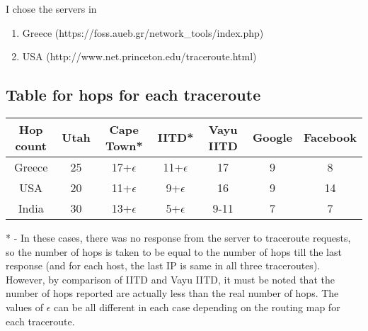 \documentclass[a4paper]{article}
\begin{document}
I chose the servers in
\begin{enumerate}
    \item Greece (https://foss.aueb.gr/network\_tools/index.php) 
    \item USA (http://www.net.princeton.edu/traceroute.html)
\end{enumerate}

\subsection{Table for hops for each traceroute}

\begin{center}
    \begin{tabular}{|c|c|c|c|c|c|c|}
        \hline
        Hop count   & Utah  & Cape Town*    & IITD*         & Vayu IITD & Google    & Facebook  \\
        \hline
        Greece      & 25    & 17+$\epsilon$ & 11+$\epsilon$ &  17       & 9         & 8         \\
        \hline
        USA         & 20    & 11+$\epsilon$ & 9+$\epsilon$  &  16       & 9         & 14        \\
        \hline
        India       & 30    & 13+$\epsilon$ & 5+$\epsilon$  &  9-11     & 7         & 7         \\
        \hline
    \end{tabular}
\end{center}

* - In these cases, there was no response from the server to traceroute requests, so the number of hops is taken to be equal to the number of hops till the last response (and for each host, the last IP is same in all three traceroutes). However, by comparison of IITD and Vayu IITD, it must be noted that the number of hops reported are actually less than the real number of hops. The values of $\epsilon$ can be all different in each case depending on the routing map for each
traceroute.
\end{document}
